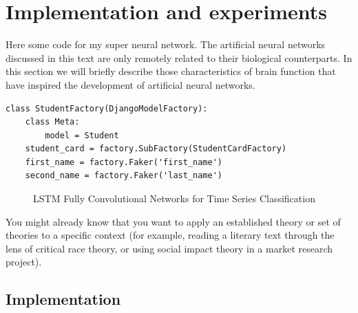 \chapter{Implementation and experiments}
\label{sec:imp}

Here some code for my super neural network. 
The artificial neural networks discussed in this text are only remotely related to their biological counterparts. In this section we will briefly describe those characteristics of brain function that have inspired the development of artificial neural networks.

 
\begin{lstlisting}[caption={StudentFactory},captionpos=b]
class StudentFactory(DjangoModelFactory):
	class Meta:
		model = Student
	student_card = factory.SubFactory(StudentCardFactory)
	first_name = factory.Faker('first_name')
	second_name = factory.Faker('last_name')
\end{lstlisting}

\begin{figure}
	\caption{LSTM Fully Convolutional Networks for Time Series Classification}
	\label{fig:nn1}
\end{figure}

You might already know that you want to apply an established theory or set of theories to a specific context (for example, reading a literary text through the lens of critical race theory, or using social impact theory in a market research project). 

\section{Implementation}
\label{sec:imp:programming}

